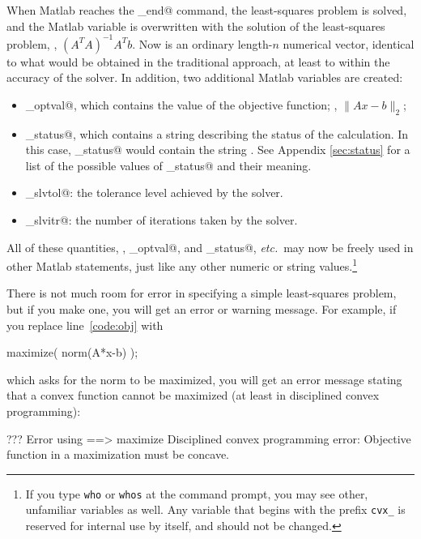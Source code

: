 \documentclass[12pt]{article}
\begin{document}
When Matlab reaches the \verb@cvx_end@ command, the least-squares
problem is solved,
and the Matlab variable \verb@x@ is overwritten
with the solution of the least-squares problem, \ie, $(A^TA)^{-1}A^Tb$.
Now \verb@x@ is an ordinary length-$n$ numerical vector, identical
to what would be obtained in the traditional approach, at least to
within the accuracy of the solver. In addition, two additional Matlab
variables are created:
\begin{itemize}
\item \verb@cvx_optval@, which contains the value of the objective
function; \ie, $\|Ax-b\|_2$;
\item \verb@cvx_status@, which contains a string describing the
status of the calculation. In this case, \verb@cvx_status@
would contain the string \verb@Solved@. See Appendix \ref{sec:status}
for a list of the possible values of \verb@cvx_status@ and their meaning.
\item \verb@cvx_slvtol@: the tolerance level achieved by the solver.
\item \verb@cvx_slvitr@: the number of iterations taken by the solver.
\end{itemize}
All of these quantities, \verb@x@, \verb@cvx_optval@, and
\verb@cvx_status@, \emph{etc.}\ may now be freely used in other Matlab
statements, just like any other numeric or string values.\footnote{If you type
\texttt{who} or \texttt{whos} at the command prompt, you may see other, unfamiliar
variables as well. Any variable that begins with the prefix \texttt{cvx\_} is 
reserved for internal use by \cvx itself, and should not be changed.}

There is not much room for error in specifying a simple least-squares
problem, but if you make one, you will get an error or warning message.
For example, if you replace line~\ref{code:obj} with
\begin{code}
	maximize( norm(A*x-b) );
\end{code}
which asks for the norm to be maximized, you will get an error message
stating that a convex function cannot be maximized (at least in
disciplined convex programming):
\begin{code}
??? Error using ==> maximize
Disciplined convex programming error:
Objective function in a maximization must be concave.
\end{code}
\end{document}
